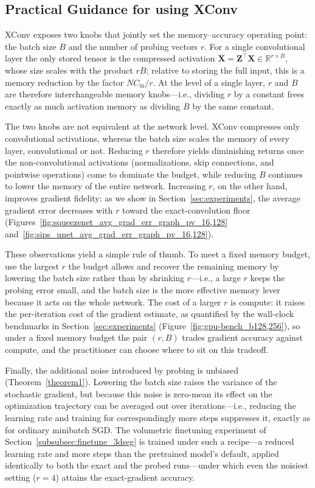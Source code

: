 \documentclass[10pt]{article}
\newcommand{\B}{\mathbf}
\begin{document}
\subsection{Practical Guidance for using XConv}
\label{subsec:prac_guid}

XConv exposes two knobs that jointly set the memory--accuracy operating point: the batch size $B$ and the number of probing vectors $r$. For a single convolutional layer the only stored tensor is the compressed activation $\B{\overline{X}}=\B{Z}^\top\B{X}\in\mathbb{R}^{r\times B}$, whose size scales with the product $rB$; relative to storing the full input, this is a memory reduction by the factor $N C_{\text{in}}/r$. At the level of a single layer, $r$ and $B$ are therefore interchangeable memory knobs---i.e., dividing $r$ by a constant frees exactly as much activation memory as dividing $B$ by the same constant.

The two knobs are not equivalent at the network level. XConv compresses only convolutional activations, whereas the batch size scales the memory of every layer, convolutional or not. Reducing $r$ therefore yields diminishing returns once the non-convolutional activations (normalizations, skip connections, and pointwise operations) come to dominate the budget, while reducing $B$ continues to lower the memory of the entire network. Increasing $r$, on the other hand, improves gradient fidelity: as we show in Section~\ref{sec:experiments}, the average gradient error decreases with $r$ toward the exact-convolution floor (Figures~\ref{fig:squeezenet_avg_grad_err_graph_pv_16,128} and~\ref{fig:sips_unet_avg_grad_err_graph_pv_16,128}).

These observations yield a simple rule of thumb. To meet a fixed memory budget, use the largest $r$ the budget allows and recover the remaining memory by lowering the batch size rather than by shrinking $r$---i.e., a large $r$ keeps the probing error small, and the batch size is the more effective memory lever because it acts on the whole network. The cost of a larger $r$ is compute: it raises the per-iteration cost of the gradient estimate, as quantified by the wall-clock benchmarks in Section~\ref{sec:experiments} (Figure~\ref{fig:gpu-bench_b128,256}), so under a fixed memory budget the pair $(r,B)$ trades gradient accuracy against compute, and the practitioner can choose where to sit on this tradeoff.

Finally, the additional noise introduced by probing is unbiased (Theorem~\ref{theorem1}). Lowering the batch size raises the variance of the stochastic gradient, but because this noise is zero-mean its effect on the optimization trajectory can be averaged out over iterations---i.e., reducing the learning rate and training for correspondingly more steps suppresses it, exactly as for ordinary minibatch SGD. The volumetric finetuning experiment of Section~\ref{subsubsec:finetune_3dseg} is trained under such a recipe---a reduced learning rate and more steps than the pretrained model's default, applied identically to both the exact and the probed runs---under which even the noisiest setting ($r=4$) attains the exact-gradient accuracy.
\end{document}

